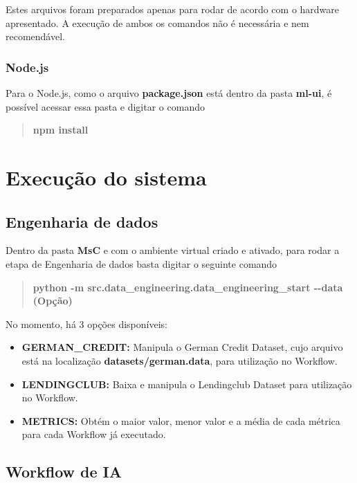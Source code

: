 \documentclass[portugues]{ic-tese}
\begin{document}
Estes arquivos foram preparados apenas para rodar de acordo com o hardware apresentado. A execução de ambos os comandos não é necessária e nem recomendável.

\subsubsection{Node.js}

Para o Node.js, como o arquivo \textbf{package.json} está dentro da pasta \textbf{ml-ui}, é possível acessar essa pasta e digitar o comando

\begin{quote}\textbf{npm install}\end{quote}

\section{Execução do sistema}

\subsection{Engenharia de dados}

Dentro da pasta \textbf{MsC} e com o ambiente virtual criado e ativado, para rodar a etapa de Engenharia de dados basta digitar o seguinte comando

\begin{quote}\textbf{python -m src.data\_engineering.data\_engineering\_start -{}-data (Opção)}\end{quote}

No momento, há 3 opções disponíveis:

\begin{itemize}
    \item {\textbf{GERMAN\_CREDIT:}} Manipula o German Credit Dataset, cujo arquivo está na localização \textbf{datasets/german.data}, para utilização no Workflow.
    \item {\textbf{LENDINGCLUB:}} Baixa e manipula o Lendingclub Dataset para utilização no Workflow.
    \item {\textbf{METRICS:}} Obtém o maior valor, menor valor e a média de cada métrica para cada Workflow já executado.
\end{itemize}

\subsection{Workflow de IA}
\end{document}
